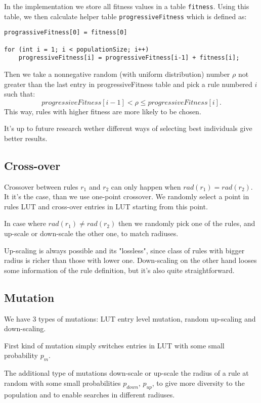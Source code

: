 \documentclass[12pt,a4paper]{article}
\begin{document}
In the implementation we store all fitness values in a table \verb+fitness+. Using this table, we then calculate helper table \verb+progressiveFitness+ which is defined as:
\begin{verbatim}
prograssiveFitness[0] = fitness[0]

for (int i = 1; i < populationSize; i++)
	progressiveFitness[i] = progressiveFitness[i-1] + fitness[i];
\end{verbatim}

Then we take a nonnegative random (with uniform distribution) number $\rho$ not greater than the last entry in progressiveFitness table and pick a rule numbered $i$ such that:
\[ progressiveFitness[i-1] < \rho \leq progressiveFitness[i].\]
This way, rules with higher fitness are more likely to be chosen.

It's up to future research wether different ways of selecting best individuals give better results. 

\subsection{Cross-over}

Crossover between rules $r_1$ and $r_2$ can only happen when $rad(r_1) = rad(r_2)$. It it's the case, than we use one-point crossover. We randomly select a point in rules LUT and cross-over entries in LUT starting from this point. 

In case where $rad(r_1)\neq rad(r_2)$ then we randomly pick one of the rules, and up-scale or down-scale the other one, to match radiuses.

Up-scaling is always possible and its "lossless", since class of rules with bigger radius is richer than those with lower one. Down-scaling on the other hand looses some information of the rule definition, but it's also quite straightforward. 

\subsection{Mutation}

We have 3 types of mutations: LUT entry level mutation, random up-scaling and down-scaling.

First kind of mutation simply switches entries in LUT with some small probability $p_m$.

The additional type of mutations down-scale or up-scale the radius of a rule at random with some small probabilities $p_{down}$, $p_{up}$, to give more diversity to the population and to enable searches in different radiuses.
\end{document}
